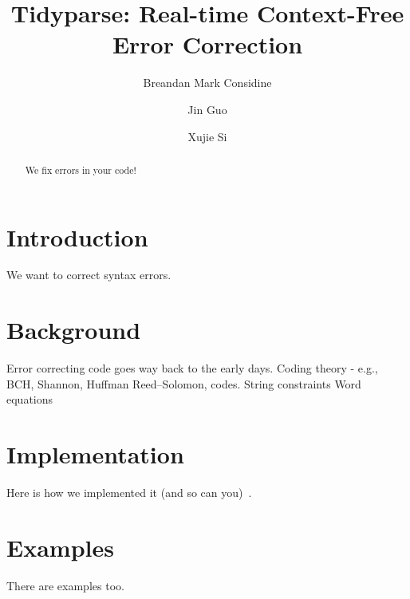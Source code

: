 \documentclass[sigplan,nonacm]{acmart}\settopmatter{printfolios=false,printccs=false,printacmref=false}
\begin{document}
\title{Tidyparse: Real-time Context-Free Error Correction}
\begin{abstract}
    We fix errors in your code!
\end{abstract}

\author{Breandan Mark Considine}

\author{Jin Guo}

\author{Xujie Si}

\maketitle

\section{Introduction}
    We want to correct syntax errors.
\section{Background}
Error correcting code goes way back to the early days.
Coding theory - e.g., BCH, Shannon, Huffman Reed–Solomon, codes.
String constraints
Word equations

\section{Implementation}
    Here is how we implemented it (and so can you)~\cite{valiant1975general}.
\section{Examples}
    There are examples too.

\end{document}
